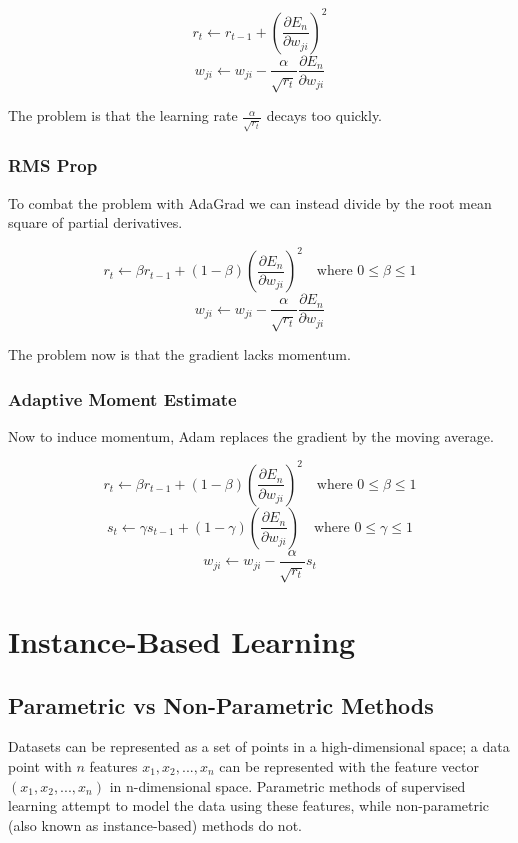 \documentclass[12pt]{article}
\begin{document}
            $$ r_t \leftarrow r_{t-1} + (\frac{\partial E_n}{\partial w_{ji}})^2 $$
            $$ w_{ji} \leftarrow w_{ji} - \frac{\alpha}{\sqrt{r_t}} \frac{\partial E_n}{\partial w_{ji}} $$

            The problem is that the learning rate $\frac{\alpha}{\sqrt{r_t}}$ decays too quickly.

        \subsubsection{RMS Prop} \label{sec:RMSProp}
            To combat the problem with AdaGrad we can instead divide by the root mean square of partial derivatives.

            $$ r_t \leftarrow \beta r_{t-1} + (1 - \beta)(\frac{\partial E_n}{\partial w_{ji}})^2 \quad \text{where $0
            \leq \beta \leq 1$}$$
            $$ w_{ji} \leftarrow w_{ji} - \frac{\alpha}{\sqrt{r_t}} \frac{\partial E_n}{\partial w_{ji}} $$

            The problem now is that the gradient lacks momentum.

        \subsubsection{Adaptive Moment Estimate} \label{sec:ADAM}
            Now to induce momentum, Adam replaces the gradient by the moving average.

            $$ r_t \leftarrow \beta r_{t-1} + (1 - \beta)(\frac{\partial E_n}{\partial w_{ji}})^2 \quad \text{where $0
            \leq \beta \leq 1$} $$
            $$ s_t \leftarrow \gamma s_{t-1} + (1 - \gamma)(\frac{\partial E_n}{\partial w_{ji}}) \quad \text{where $0
            \leq \gamma \leq 1$} $$
            $$ w_{ji} \leftarrow w_{ji} - \frac{\alpha}{\sqrt{r_t}}s_t $$

\section{Instance-Based Learning}
    \subsection{Parametric vs Non-Parametric Methods}
        Datasets can be represented as a set of points in a high-dimensional space; a data point with $n$ features $x_1,
        x_2, ..., x_n$ can be represented with the feature vector $(x_1, x_2, ..., x_n)$ in n-dimensional space.
        Parametric methods of supervised learning attempt to model the data using these features, while non-parametric
        (also known as instance-based) methods do not.
\end{document}
